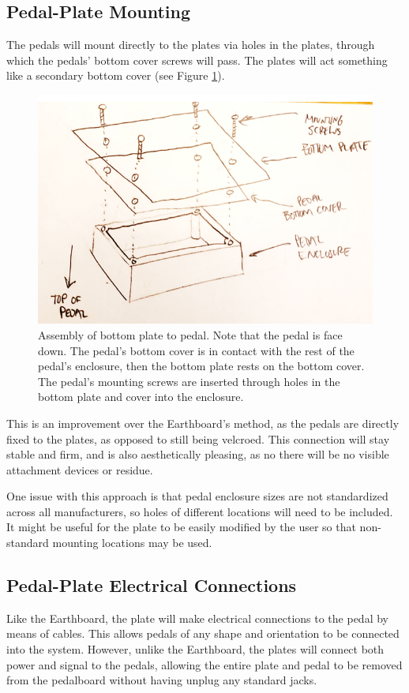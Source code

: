 \documentclass{article}
\begin{document}
\subsection{Pedal-Plate Mounting}

The pedals will mount directly to the plates via holes in the plates, through which the pedals' bottom cover screws will pass.  The plates will act something like a secondary bottom cover (see Figure \ref{fig:plate_pedal_mounting}).

\begin{figure}
    \centering
    \includegraphics[width = 0.6 \textwidth]{plate_pedal_mounting_img}
    \caption{Assembly of bottom plate to pedal.  Note that the pedal is face down.  The pedal's bottom cover is in contact with the rest of the pedal's enclosure, then the bottom plate rests on the bottom cover.  The pedal's mounting screws are inserted through holes in the bottom plate and cover into the enclosure.}
    \label{fig:plate_pedal_mounting}
\end{figure}

This is an improvement over the Earthboard's method, as the pedals are directly fixed to the plates, as opposed to still being velcroed.  This connection will stay stable and firm, and is also aesthetically pleasing, as no there will be no visible attachment devices or residue.

One issue with this approach is that pedal enclosure sizes are not standardized across all manufacturers, so holes of different locations will need to be included.  It might be useful for the plate to be easily modified by the user so that non-standard mounting locations may be used.

\subsection{Pedal-Plate Electrical Connections}

Like the Earthboard, the plate will make electrical connections to the pedal by means of cables.  This allows pedals of any shape and orientation to be connected into the system.  However, unlike the Earthboard, the plates will connect both power and signal to the pedals, allowing the entire plate and pedal to be removed from the pedalboard without having unplug any standard jacks.
\end{document}
